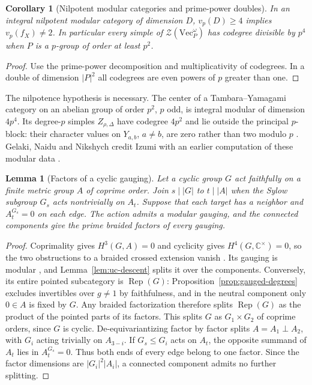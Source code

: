 \documentclass[11pt,a4paper]{article}
\numberwithin{equation}{section}
\newtheorem{lemma}[theorem]{Lemma}
\newtheorem{corollary}[theorem]{Corollary}
\theoremstyle{remark}
\newcommand{\Z}{\mathcal Z}
\renewcommand{\Vec}{\mathrm{Vec}}
\newcommand{\Rep}{\operatorname{Rep}}
\newcommand{\CC}{\mathbb C}
\begin{document}
\begin{corollary}[Nilpotent modular categories and prime-power doubles]\label{fam:M:13.5}
\label{cor:nilpotent-no-defect-two}
In an integral nilpotent modular category of dimension $D$,
$v_p(D)\ge4$ implies $v_p(f_X)\ne2$. In particular every simple of
$\Z(\Vec_P^\omega)$ has codegree divisible by $p^4$ when $P$ is a
$p$-group of order at least $p^2$.
\end{corollary}
\begin{proof}
Use the prime-power decomposition \cite[Theorem~1.1]{DGNOnil} and
multiplicativity of codegrees. In a double of dimension $|P|^2$
all codegrees are even powers of $p$ greater than one.
\end{proof}
The nilpotence hypothesis is necessary. The center of a
Tambara--Yamagami category on an abelian group of order $p^2$,
$p$ odd, is integral modular of dimension $4p^4$. Its degree-$p$
simples $Z_{\rho,\Delta}$ have codegree $4p^2$ and lie outside
the principal $p$-block: their character values on $Y_{a,b}$,
$a\ne b$, are zero rather than two modulo $p$
\cite[Proposition~4.1 and the $S$-matrix on p.~977]{GNNcenters}.
Gelaki, Naidu and Nikshych credit Izumi with an earlier computation of
these modular data \cite[Remark~4.3]{GNNcenters}.

\begin{lemma}[Factors of a cyclic gauging]\label{fam:M:13.6}\label{lem:cyclic-gauging}
Let a cyclic group $G$ act faithfully on a finite metric group $A$
of coprime order. Join $s\mid |G|$ to $t\mid |A|$ when the Sylow
subgroup $G_s$ acts nontrivially on $A_t$. Suppose that each target
has a neighbor and $A_t^{G_s}=0$ on each edge. The action admits a
modular gauging, and the connected components give the prime braided
factors of every gauging.
\end{lemma}
\begin{proof}
Coprimality gives $H^3(G,A)=0$ and cyclicity gives
$H^4(G,\CC^\times)=0$, so the two obstructions to a braided crossed
extension vanish \cite[Proposition~7.3 and Theorem~7.12]{ENOH}. Its gauging is modular
\cite[Proposition~4.56(ii)]{DGNO}, and Lemma~\ref{lem:uc-descent}
splits it over the components. Conversely, its entire pointed subcategory is $\Rep(G)$:
Proposition~\ref{prop:gauged-degrees} excludes invertibles over
$g\ne1$ by faithfulness, and in the neutral component only $0\in A$
is fixed by $G$. Any braided factorization therefore splits
$\Rep(G)$ as the product of the pointed parts of its factors. This
splits $G$ as $G_1\times G_2$ of coprime orders, since $G$ is cyclic.
De-equivariantizing factor by factor splits $A=A_1\perp A_2$, with
$G_i$ acting trivially on $A_{3-i}$. If $G_s\le G_i$ acts on $A_t$,
the opposite summand of $A_t$ lies in $A_t^{G_s}=0$. Thus both ends of
every edge belong to one factor. Since the factor dimensions are
$|G_i|^2|A_i|$, a connected component admits no further splitting.
\end{proof}
\end{document}
